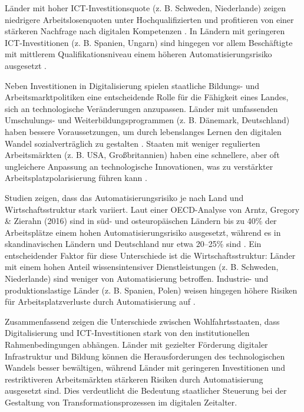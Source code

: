 Länder mit hoher \ac{ICT}-Investitionsquote (z. B. Schweden, Niederlande) zeigen 
niedrigere Arbeitslosenquoten unter Hochqualifizierten und profitieren von einer 
stärkeren Nachfrage nach digitalen Kompetenzen 
\parencite[vgl.][S. 78]{brynjolfsson2014thesecond}. In Ländern mit geringeren 
\ac{ICT}-Investitionen (z. B. Spanien, Ungarn) sind hingegen vor allem Beschäftigte mit 
mittlerem Qualifikationsniveau einem höheren Automatisierungsrisiko ausgesetzt 
\parencite[vgl.][S. 12]{frey2013thefuture}.

Neben Investitionen in Digitalisierung spielen staatliche Bildungs- und 
Arbeitsmarktpolitiken eine entscheidende Rolle für die Fähigkeit eines Landes, sich an 
technologische Veränderungen anzupassen. Länder mit umfassenden Umschulungs- und 
Weiterbildungsprogrammen (z. B. Dänemark, Deutschland) haben bessere Voraussetzungen, um 
durch lebenslanges Lernen den digitalen Wandel sozialverträglich zu gestalten 
\parencite[vgl.][S. 361]{vu2011ict}. Staaten mit weniger regulierten Arbeitsmärkten 
(z. B. USA, Großbritannien) haben eine schnellere, aber oft ungleichere Anpassung an 
technologische Innovationen, was zu verstärkter Arbeitsplatzpolarisierung führen kann 
\parencite[vgl.][S. 172]{goos2014explaining}.

Studien zeigen, dass das Automatisierungsrisiko je nach Land und Wirtschaftsstruktur stark 
variiert. Laut einer \ac{OECD}-Analyse von Arntz, Gregory \& Zierahn (2016) sind in süd- 
und osteuropäischen Ländern bis zu 40\% der Arbeitsplätze einem hohen 
Automatisierungsrisiko ausgesetzt, während es in skandinavischen Ländern und Deutschland 
nur etwa 20–25\% sind \parencite[vgl.][S. 12]{arntz2016therisk}. Ein entscheidender 
Faktor für diese Unterschiede ist die Wirtschaftsstruktur: Länder mit einem hohen Anteil 
wissensintensiver Dienstleistungen (z. B. Schweden, Niederlande) sind weniger von 
Automatisierung betroffen. Industrie- und produktionslastige Länder (z. B. Spanien, Polen) 
weisen hingegen höhere Risiken für Arbeitsplatzverluste durch Automatisierung auf 
\parencite[vgl.][S. 260]{frey2013thefuture}.

Zusammenfassend zeigen die Unterschiede zwischen Wohlfahrtsstaaten, dass Digitalisierung 
und \ac{ICT}-Investitionen stark von den institutionellen Rahmenbedingungen abhängen. 
Länder mit gezielter Förderung digitaler Infrastruktur und Bildung können die 
Herausforderungen des technologischen Wandels besser bewältigen, während Länder mit 
geringeren Investitionen und restriktiveren Arbeitsmärkten stärkeren Risiken durch 
Automatisierung ausgesetzt sind. Dies verdeutlicht die Bedeutung staatlicher Steuerung 
bei der Gestaltung von Transformationsprozessen im digitalen Zeitalter.

